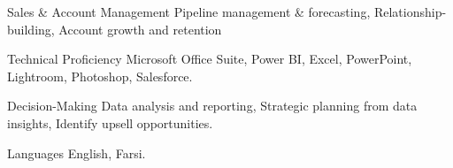 \vspace{-1.0mm}


\begin{cvskills}


\cvskill
{Sales \& Account Management} %
{Pipeline management \& forecasting, Relationship-building, Account growth and retention} %



\cvskill
{Technical Proficiency} %
{Microsoft Office Suite, Power BI, Excel, PowerPoint, Lightroom, Photoshop, Salesforce.} %


\cvskill
{Decision-Making} %
{Data analysis and reporting, Strategic planning from data insights, Identify upsell opportunities.} %

\cvskill
{Languages} %
{English, Farsi.} %


\end{cvskills}
